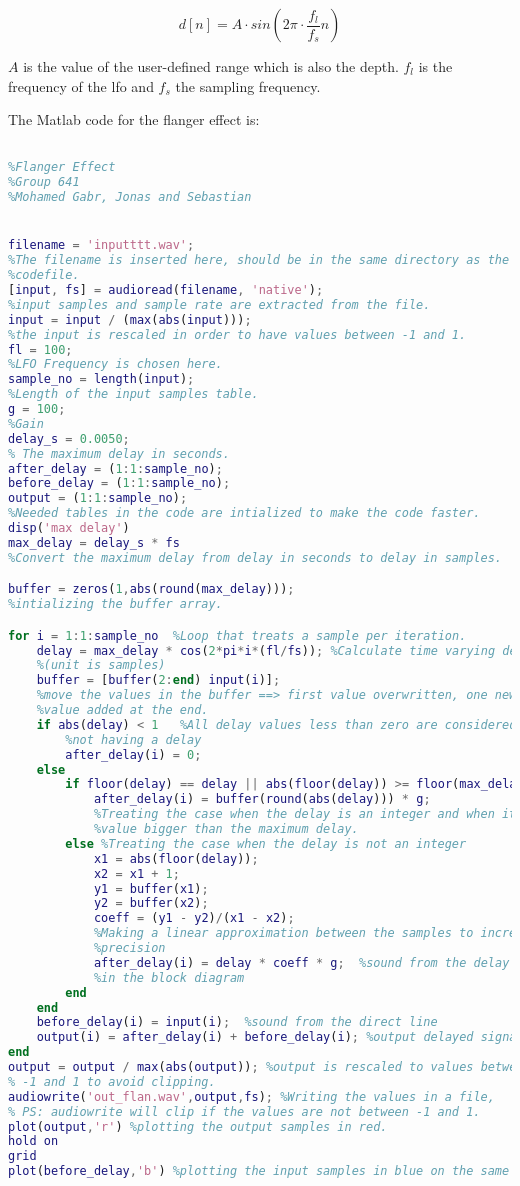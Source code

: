 \begin{equation}
	d[n]= A \cdot sin(2\pi  \cdot \frac{f_{l}}{f_{s}} n)
\end{equation}

$A$ is the value of the user-defined range which is also the depth. $f_{l}$ is the frequency of the \gls{lfo} and $f_{s}$ the sampling frequency. 

The Matlab code for the flanger effect is:

\begin{lstlisting}[language=Matlab, caption= Matlab code for flanger effect]

%Flanger Effect
%Group 641
%Mohamed Gabr, Jonas and Sebastian


filename = 'inputttt.wav'; 
%The filename is inserted here, should be in the same directory as the
%codefile.
[input, fs] = audioread(filename, 'native');
%input samples and sample rate are extracted from the file.
input = input / (max(abs(input)));
%the input is rescaled in order to have values between -1 and 1. 
fl = 100;  
%LFO Frequency is chosen here.
sample_no = length(input); 
%Length of the input samples table.
g = 100; 
%Gain
delay_s = 0.0050; 
% The maximum delay in seconds.
after_delay = (1:1:sample_no); 
before_delay = (1:1:sample_no);
output = (1:1:sample_no);
%Needed tables in the code are intialized to make the code faster.
disp('max delay')
max_delay = delay_s * fs  
%Convert the maximum delay from delay in seconds to delay in samples.

buffer = zeros(1,abs(round(max_delay))); 
%intializing the buffer array.

for i = 1:1:sample_no  %Loop that treats a sample per iteration. 
	delay = max_delay * cos(2*pi*i*(fl/fs)); %Calculate time varying delay 
	%(unit is samples)
	buffer = [buffer(2:end) input(i)]; 
	%move the values in the buffer ==> first value overwritten, one new 
	%value added at the end.
	if abs(delay) < 1   %All delay values less than zero are considered as
		%not having a delay
		after_delay(i) = 0;
	else
		if floor(delay) == delay || abs(floor(delay)) >= floor(max_delay)
			after_delay(i) = buffer(round(abs(delay))) * g;
			%Treating the case when the delay is an integer and when it has a
			%value bigger than the maximum delay. 
		else %Treating the case when the delay is not an integer
			x1 = abs(floor(delay));
			x2 = x1 + 1;
			y1 = buffer(x1);
			y2 = buffer(x2);
			coeff = (y1 - y2)/(x1 - x2);
			%Making a linear approximation between the samples to increase
			%precision
			after_delay(i) = delay * coeff * g;  %sound from the delay line
			%in the block diagram 
		end
	end
	before_delay(i) = input(i);  %sound from the direct line
	output(i) = after_delay(i) + before_delay(i); %output delayed signal 
end
output = output / max(abs(output)); %output is rescaled to values between
% -1 and 1 to avoid clipping. 
audiowrite('out_flan.wav',output,fs); %Writing the values in a file, 
% PS: audiowrite will clip if the values are not between -1 and 1. 
plot(output,'r') %plotting the output samples in red.
hold on
grid
plot(before_delay,'b') %plotting the input samples in blue on the same fig.




\end{lstlisting}


